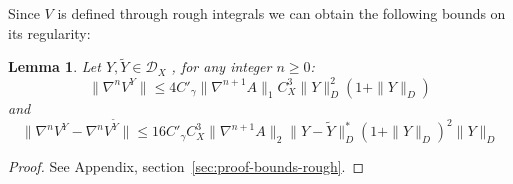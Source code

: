 \documentclass[a4paper,12pt,reqno]{amsart}
\newcommand{\wt}{\widetilde}
\newcommand{\norm}[1]{\|#1\|}
\newtheorem{lemma}{Lemma}
\newcommand{\DX}{\mathscr{D}_{X}}
\begin{document}
\medskip

Since $V$ is defined through rough integrals we can obtain the
following bounds on its regularity:

\begin{lemma}
\label{lemma:bounds-rough}
Let $Y,\wt Y \in \DX$
, for any integer $n \ge 0$:
  \begin{equation}
    \label{eq:bound-rough-v}
\norm{\nabla^n V^Y} \le
4 C'_\gamma
\norm{\nabla^{n+1} A}_1 C_X^3 \norm{Y}_D^2 (1+\norm{Y}_D)
  \end{equation}
and
  \begin{equation}
    \label{eq:bound-rough-v2}
\norm{\nabla^n V^Y-\nabla^n V^{\wt Y}} \le
16 C'_\gamma C_X^3 \norm{\nabla^{n+1} A}_2 \norm{Y-\wt Y}_D^*
  (1+\norm{Y}_D)^2 \norm{Y}_D
  \end{equation}
\end{lemma}
\begin{proof}
See Appendix, section~\ref{sec:proof-bounds-rough}.  
\end{proof}
\end{document}
